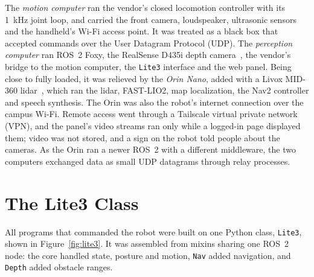 \documentclass[11pt,a4paper]{article}
\begin{document}
The \emph{motion computer} ran the vendor's closed locomotion controller with its 1~kHz joint loop, and
carried the front camera, loudspeaker, ultrasonic sensors and the handheld's Wi-Fi access point. It was
treated as a black box that accepted commands over the User Datagram Protocol (UDP). The \emph{perception
computer} ran ROS~2 Foxy, the RealSense D435i depth camera~\cite{realsense}, the vendor's bridge to the
motion computer, the \texttt{Lite3} interface and the web panel. Being close to fully loaded, it was
relieved by the \emph{Orin Nano}, added with a Livox MID-360 lidar~\cite{livox}, which ran the lidar,
FAST-LIO2, map localization, the Nav2 controller and speech synthesis. The Orin was also the robot's
internet connection over the campus Wi-Fi. Remote access went through a Tailscale virtual private network (VPN), and the panel's video
streams ran only while a logged-in page displayed them; video was not stored, and a sign on the robot
told people about the cameras. As the Orin ran a newer ROS~2 with a different
middleware, the two computers exchanged data as small UDP datagrams through relay processes.

\section{The Lite3 Class}

All programs that commanded the robot were built on one Python class, \texttt{Lite3}, shown in
Figure~\ref{fig:lite3}. It was assembled from mixins sharing one ROS~2 node: the core handled state,
posture and motion, \texttt{Nav} added navigation, and \texttt{Depth} added obstacle ranges.
\end{document}
